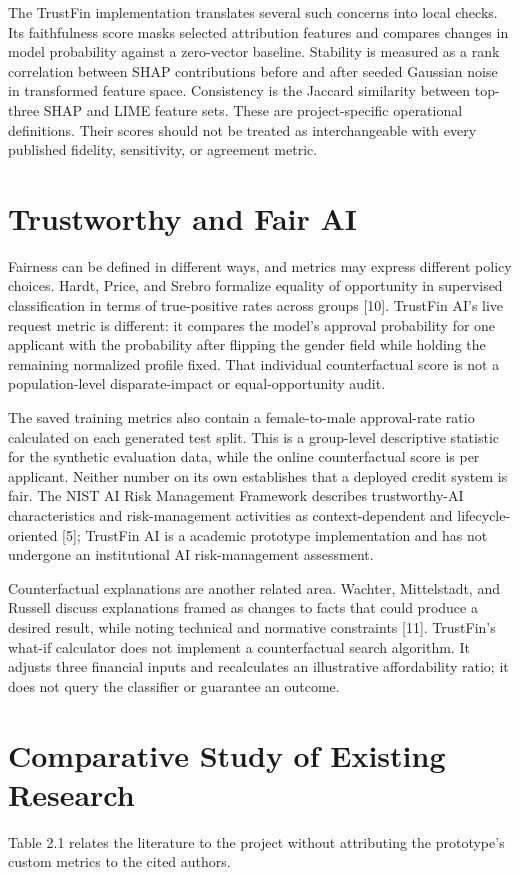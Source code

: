 \documentclass[12pt,a4paper]{report}
\begin{document}
The TrustFin implementation translates several such concerns into local checks. Its faithfulness score masks selected attribution features and compares changes in model probability against a zero-vector baseline. Stability is measured as a rank correlation between SHAP contributions before and after seeded Gaussian noise in transformed feature space. Consistency is the Jaccard similarity between top-three SHAP and LIME feature sets. These are project-specific operational definitions. Their scores should not be treated as interchangeable with every published fidelity, sensitivity, or agreement metric.

\section{Trustworthy and Fair AI}
Fairness can be defined in different ways, and metrics may express different policy choices. Hardt, Price, and Srebro formalize equality of opportunity in supervised classification in terms of true-positive rates across groups [10]. TrustFin AI’s live request metric is different: it compares the model’s approval probability for one applicant with the probability after flipping the gender field while holding the remaining normalized profile fixed. That individual counterfactual score is not a population-level disparate-impact or equal-opportunity audit.

The saved training metrics also contain a female-to-male approval-rate ratio calculated on each generated test split. This is a group-level descriptive statistic for the synthetic evaluation data, while the online counterfactual score is per applicant. Neither number on its own establishes that a deployed credit system is fair. The NIST AI Risk Management Framework describes trustworthy-AI characteristics and risk-management activities as context-dependent and lifecycle-oriented [5]; TrustFin AI is a academic prototype implementation and has not undergone an institutional AI risk-management assessment.

Counterfactual explanations are another related area. Wachter, Mittelstadt, and Russell discuss explanations framed as changes to facts that could produce a desired result, while noting technical and normative constraints [11]. TrustFin’s what-if calculator does not implement a counterfactual search algorithm. It adjusts three financial inputs and recalculates an illustrative affordability ratio; it does not query the classifier or guarantee an outcome.

\section{Comparative Study of Existing Research}
Table 2.1 relates the literature to the project without attributing the prototype's custom metrics to the cited authors.
\end{document}
